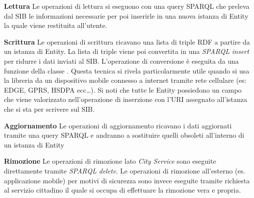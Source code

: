 \begin{description}
	\item \textbf{Lettura} Le operazioni di lettura si eseguono con una query SPARQL che preleva dal SIB le informazioni necessarie per poi inserirle in una nuova istanza di Entity la quale viene restituita all'utente.

	\item \textbf{Scrittura} Le operazioni di scrittura ricavano una lista di triple RDF a partire da un istanza di Entity. La lista di triple viene poi convertita in una \emph{SPARQL insert} per ridurre i dati inviati al SIB. L'operazione di conversione è eseguita da una funzione della classe . Questa tecnica si rivela particolarmente utile quando si usa la libreria da un dispositivo mobile connesso a internet tramite rete cellulare (es: EDGE, GPRS, HSDPA ecc\dots). Si noti che tutte le Entity possiedono un campo  che viene valorizzato nell'operazione di inserzione con l'URI assegnato all'istanza che si sta per scrivere sul SIB. 

	\item \textbf{Aggiornamento} Le operazioni di aggiornamento ricavano i dati aggiornati tramite una query SPARQL e andranno a sostituire quelli obsoleti all'interno di un istanza di Entity

	\item \textbf{Rimozione} Le operazioni di rimozione lato \emph{City Service} sono eseguite direttamente tramite \emph{SPARQL delete}. Le operazioni di rimozione all'esterno (es. applicazione mobile) per motivi di sicurezza sono invece eseguite tramite richiesta al servizio cittadino il quale si occupa di effettuare la rimozione vera e propria.
\end{description}













